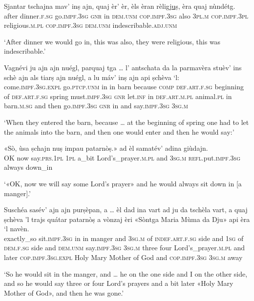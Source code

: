 \begin{linenumbers}
\gll  Sjantar tschajna mav’ inṣ ajn, quaj èr’ èr, èls èran rèligj\underline{u}ṣ, èra quaj nùndétg. \\
after dinner.\textsc{f.sg} go.\textsc{impf.3sg} \textsc{gnr} in \textsc{dem.unm} \textsc{cop.impf.3sg} also \textsc{3pl.m} \textsc{cop.impf.3pl} religious.\textsc{m.pl} \textsc{cop.impf.3sg} \textsc{dem.unm} indescribable.\textsc{adj.unm}  \\
\end{linenumbers}
\medskip
\glt `After dinner we would go in, this was also, they were religious, this was indescribable.'
\medskip

\begin{linenumbers}
\gll  Vagnévi ju ajn ajn nuégl, parquaj tga … l’ antschata da la parmavèra stuèv’ ins schè ajn als tiarṣ ajn nuégl, a lu máv’ inṣ ajn api ṣchèva `l:   \\
 come.\textsc{impf.3sg.expl} go.\textsc{ptcp.unm} in in barn because \textsc{comp} {} \textsc{def.art.f.sg} beginning of \textsc{def.art.f.sg} spring must.\textsc{impf.3sg} \textsc{gnr} let.\textsc{inf} in \textsc{def.art.m.pl} animal.\textsc{pl} in barn.\textsc{m.sg} and then go.\textsc{impf.3sg} \textsc{gnr} in and say.\textsc{impf.3sg} \textsc{3sg.m}\\
\end{linenumbers}
\medskip
\glt `When they entered the barn, because … at the beginning of spring one had to let the animals into the barn, and then one would enter and then he would say:'
\medskip

\begin{linenumbers}
\gll  «Sò, ùsa ṣchajn nuṣ impau patarnòṣ.» ad èl samatév’ adina giùdajn.  \\
OK now say.\textsc{prs.1pl} \textsc{1pl} a\_bit  Lord’s\_prayer.\textsc{m.pl} and \textsc{3sg.m} \textsc{refl}.put.\textsc{impf.3sg} always down\_in  \\
\end{linenumbers}
\medskip
\glt `«OK, now we will say some Lord’s prayer» and he would always sit down in [a manger].'
\medskip

\begin{linenumbers}
\gll Suschéa sasév’ ajn ajn purṣèpan, a … èl dad ina vart ad ju da tschèla vart, a quaj ṣchèva 'l trajs quátar  patarnòṣ a vònzaj èri «Sòntga Maria Mùma da Dju» api èra `l navèn.\\
exactly\_so sit.\textsc{impf.3sg} in in manger and {} \textsc{3sg.m} of \textsc{indef.art.f.sg} side and \textsc{1sg} of \textsc{dem.f.sg} side and \textsc{dem.unm} say.\textsc{impf.3sg} \textsc{3sg.m} three four Lord’s\_prayer.\textsc{m.pl} and later \textsc{cop.impf.3sg.expl} Holy Mary Mother of God and \textsc{cop.impf.3sg} \textsc{3sg.m} away\\
\end{linenumbers}
\medskip
\glt `So he would sit in the manger, and … he on the one side and I on the other side, and so he would say three or four Lord’s prayers and a bit later «Holy Mary Mother of God», and then he was gone.'
\medskip

